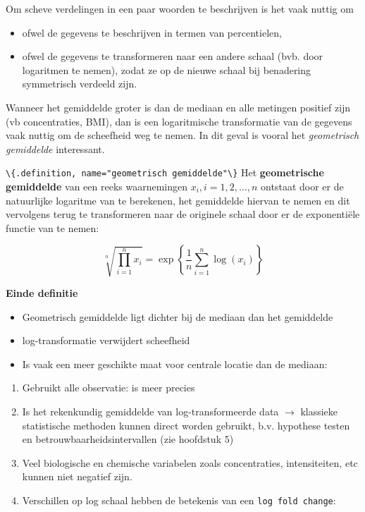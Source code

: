 \documentclass[
  12pt,dutch,coursenotes]{book}
\newcommand{\passthrough}[1]{#1}
\providecommand{\tightlist}{%
  \setlength{\itemsep}{0pt}\setlength{\parskip}{0pt}}
\begin{document}
Om scheve verdelingen in een paar woorden te beschrijven is het vaak nuttig
om

\begin{itemize}
\tightlist
\item
  ofwel de gegevens te beschrijven in termen van percentielen,
\item
  ofwel de gegevens te transformeren naar een andere schaal (bvb. door
  logaritmen te nemen), zodat ze op de nieuwe schaal bij benadering
  symmetrisch verdeeld zijn.
\end{itemize}

Wanneer het gemiddelde groter is dan de mediaan en alle metingen positief zijn (vb concentraties, BMI), dan is een logaritmische
transformatie van de gegevens vaak nuttig om de scheefheid weg te nemen. In
dit geval is vooral het \emph{geometrisch gemiddelde} interessant.

\passthrough{\lstinline!\{.definition, name="geometrisch gemiddelde"\}!}
Het \textbf{geometrische gemiddelde} van een reeks waarnemingen \(x_i, i=1, 2, \dots, n\) ontstaat door er de natuurlijke logaritme van te berekenen, het
gemiddelde hiervan te nemen en dit vervolgens terug te transformeren naar de
originele schaal door er de exponentiële functie van te nemen:

\begin{equation*}
\sqrt[n]{\prod\limits_{i=1}^n x_i} = \exp\left\{\frac{1}{n} \sum_{i=1}^n \log(x_i)\right\}
\end{equation*}

\textbf{Einde definitie}

\begin{itemize}
\item
  Geometrisch gemiddelde ligt dichter bij de mediaan dan het gemiddelde
\item
  log-transformatie verwijdert scheefheid
\item
  Is vaak een meer geschikte maat voor centrale locatie dan de mediaan:
\end{itemize}

\begin{enumerate}
\def\labelenumi{\arabic{enumi}.}
\tightlist
\item
  Gebruikt alle observatie: is meer precies
\item
  Is het rekenkundig gemiddelde van log-transformeerde data \(\rightarrow\) klassieke statistische methoden kunnen direct worden gebruikt, b.v. hypothese testen en betrouwbaarheidsintervallen (zie hoofdstuk 5)
\item
  Veel biologische en chemische variabelen zoals concentraties, intensiteiten, etc kunnen niet negatief zijn.
\item
  Verschillen op log schaal hebben de betekenis van een \passthrough{\lstinline!log fold change!}:
\end{enumerate}
\end{document}
